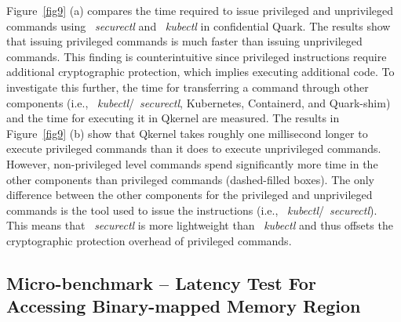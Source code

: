 Figure~\ref{fig9} (a) compares the time required to issue privileged and unprivileged commands using ~\emph{securectl} and ~\emph{kubectl} in confidential Quark. The results show that issuing privileged commands is much faster than issuing unprivileged commands. 
This finding is counterintuitive since privileged instructions require additional cryptographic protection, which implies executing additional code. To investigate this further, the time for transferring a command through other components (i.e., ~\emph{kubectl}/~\emph{securectl},  Kubernetes, Containerd, and Quark-shim) and the time for executing it in Qkernel 
are measured.  The results in Figure~\ref{fig9} (b) show that Qkernel takes roughly one millisecond longer to execute privileged commands than it does to execute unprivileged commands. However, non-privileged level commands spend significantly more 
time in the other components than privileged commands (dashed-filled boxes). The only difference between the other components for the privileged and unprivileged commands is the tool used to issue the instructions (i.e., ~\emph{kubectl}/~\emph{securectl}). This means that ~\emph{securectl} is more lightweight than 
~\emph{kubectl} and thus offsets the cryptographic protection overhead of privileged commands.






\subsection{Micro-benchmark – Latency Test For Accessing Binary-mapped Memory Region}\label{accesiing_binary_mapped_memory}


    
     
     
